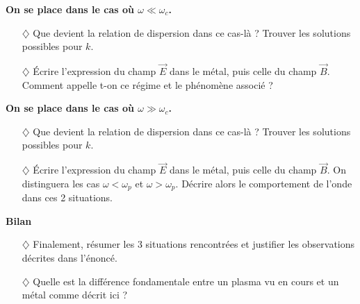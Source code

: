 \documentclass{report}
\begin{document}
\textbf{On se place dans le cas où $\omega\ll\omega_c$.}

\begin{itemize}

	\item[$\diamondsuit$] Que devient la relation de dispersion dans ce cas-là ? Trouver les solutions possibles pour $k$.

	\item[$\diamondsuit$] Écrire l'expression du champ $\vec{E}$ dans le métal, puis celle du champ $\vec{B}$. Comment appelle t-on ce régime et le phénomène associé ? 

\end{itemize}

\textbf{On se place dans le cas où $\omega\gg\omega_c$.}

\begin{itemize}

	\item[$\diamondsuit$] Que devient la relation de dispersion dans ce cas-là ? Trouver les solutions possibles pour $k$.
	
	\item[$\diamondsuit$] Écrire l'expression du champ $\vec{E}$ dans le métal, puis celle du champ $\vec{B}$. On distinguera les cas $\omega<\omega_p$ et $\omega>\omega_p$. Décrire alors le comportement de l'onde dans ces 2 situations.

\end{itemize}

\textbf{Bilan}

\begin{itemize}

	\item[$\diamondsuit$] Finalement, résumer les 3 situations rencontrées et justifier les observations décrites dans l'énoncé.

	\item[$\diamondsuit$] Quelle est la différence fondamentale entre un plasma vu en cours et un métal comme décrit ici ?

\end{itemize}
\end{document}
